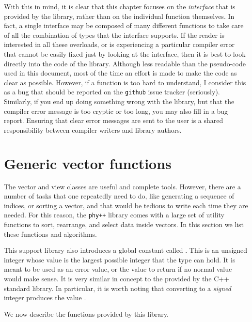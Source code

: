 \documentclass[12pt]{report}
\newcommand{\phypp}{\texttt{phy++}\xspace}
\begin{document}
With this in mind, it is clear that this chapter focuses on the \emph{interface} that is provided by the library, rather than on the individual function themselves. In fact, a single interface may be composed of many different functions to take care of all the combination of types that the interface supports. If the reader is interested in all these overloads, or is experiencing a particular compiler error that cannot be easily fixed just by looking at the interface, then it is best to look directly into the code of the library. Although less readable than the pseudo-code used in this document, most of the time an effort is made to make the code as clear as possible. However, if a function is too hard to understand, I consider this as a bug that should be reported on the \texttt{github} issue tracker (seriously). Similarly, if you end up doing something wrong with the library, but that the compiler error message is too cryptic or too long, you may also fill in a bug report. Ensuring that clear error messages are sent to the user is a shared responsibility between compiler writers and library authors.

\section{Generic vector functions \label{SEC:support:generic}}

The vector and view classes are useful and complete tools. However, there are a number of tasks that one repeatedly need to do, like generating a sequence of indices, or sorting a vector, and that would be tedious to write each time they are needed. For this reason, the \phypp library comes with a large set of utility functions to sort, rearrange, and select data inside vectors. In this section we list these functions and algorithms.

This support library also introduces a global constant called . This is an unsigned integer whose value is the largest possible integer that the  type can hold. It is meant to be used as an error value, or the value to return if no normal value would make sense. It is very similar in concept to the  provided by the C++ standard library. In particular, it is worth noting that converting  to a \emph{signed} integer produces the value .

We now describe the functions provided by this library.
\end{document}
